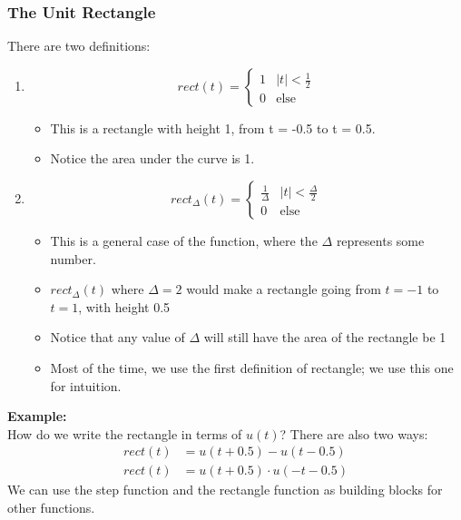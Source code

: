 \documentclass[10pt]{article}
\newcommand{\example}{\textbf{Example: }}
\begin{document}
\subsubsection*{The Unit Rectangle}
There are two definitions:
\begin{enumerate}
    \item \[rect(t) = \begin{cases} 1 & \vert t \vert < \frac{1}{2} \\ 0 & \text{else} \end{cases}\]
    \begin{itemize}
        \item This is a rectangle with height 1, from t = -0.5 to t = 0.5.
        \item Notice the area under the curve is 1.
    \end{itemize}
    \item \[rect_{\Delta}(t) = \begin{cases} \frac{1}{\Delta} & \vert t \vert < \frac{\Delta}{2}  \\ 0 & \text{else}\end{cases}\]
    \begin{itemize}
        \item This is a general case of the function, where the $\Delta$ represents some number.
        \item $rect_{\Delta}(t)$ where $\Delta = 2$ would make a rectangle going from $t = -1$ to $t = 1$, with height 0.5
        \item Notice that any value of $\Delta$ will still have the area of the rectangle be 1
        \item Most of the time, we use the first definition of rectangle; we use this one for intuition.
    \end{itemize}
\end{enumerate}
\example\\
How do we write the rectangle in terms of $u(t)$?  There are also two ways:
\begin{align*}
    rect(t) &= u(t + 0.5) - u(t - 0.5)\\
    rect(t) &= u(t + 0.5) \cdot u(-t - 0.5)
\end{align*}
We can use the step function and the rectangle function as building blocks for other functions.
\end{document}
